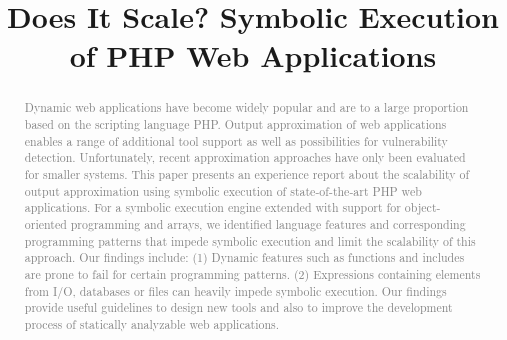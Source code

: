 \documentclass[sigconf]{acmart}
\begin{document}
\title{Does It Scale? Symbolic Execution of PHP Web Applications}


\affiliation{%
}

\affiliation{%
}

\affiliation{%
}


\renewcommand{\shortauthors}{
}


\begin{abstract}
\textcolor{gray}{
Dynamic web applications have become widely popular and are to
a large proportion based on the scripting language PHP. Output approximation of web
applications enables a range of additional tool support as well as possibilities
for vulnerability detection. Unfortunately, recent approximation approaches have
only been evaluated for smaller systems.}
\textcolor{gray}{This paper presents an experience report about the scalability of output
approximation using symbolic execution of state-of-the-art PHP web
applications. For a symbolic execution engine extended with support for
object-oriented programming and arrays, we identified language features and
corresponding programming patterns that impede symbolic execution and limit the
scalability of this approach. Our findings include: (1) Dynamic features such as
functions and includes are prone to fail for certain programming patterns. (2)
Expressions containing elements from I/O, databases or files can heavily impede
symbolic execution. Our findings provide useful guidelines to design new
tools and also to improve the development process of statically analyzable web
applications.}
\end{abstract}
\end{document}
